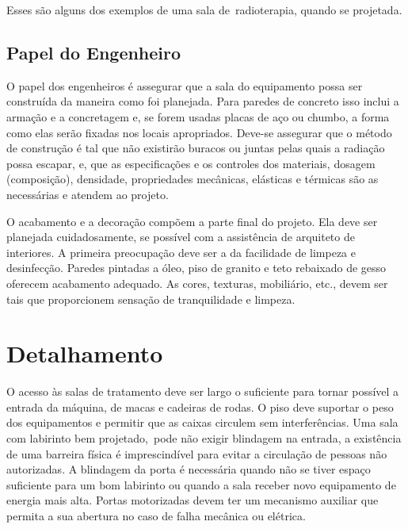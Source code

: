 \documentclass[
	12pt,				%
    oneside,			%
	a4paper,			%
	english,			%
	french,				%
	spanish,			%
	brazil,				%
	]{abntex2}
\begin{document}
Esses são alguns dos exemplos de uma sala de radioterapia, quando se projetada.

\section{Papel do Engenheiro}

O papel dos engenheiros é assegurar que a sala do equipamento possa ser construída da maneira como foi planejada. Para paredes de concreto isso inclui a armação e a concretagem e, se forem usadas placas de aço ou chumbo, a forma como elas serão fixadas nos locais apropriados. Deve-se assegurar que o método de construção é tal que não existirão buracos ou juntas pelas quais a radiação possa escapar, e, que as especificações e os controles dos materiais, dosagem (composição), densidade, propriedades mecânicas, elásticas e térmicas são as necessárias e atendem ao projeto.

O acabamento e a decoração compõem a parte final do projeto. Ela deve ser planejada cuidadosamente, se possível com a assistência de arquiteto de interiores. A primeira preocupação deve ser a da facilidade de limpeza e desinfecção. Paredes pintadas a óleo, piso de granito e teto rebaixado de gesso oferecem acabamento adequado. As cores, texturas, mobiliário, etc., devem ser tais que proporcionem sensação de tranquilidade e limpeza.

\chapter{Detalhamento}

O acesso às salas de tratamento deve ser largo o suficiente para tornar possível a entrada da máquina, de macas e cadeiras de rodas. O piso deve suportar o peso dos equipamentos e permitir que as caixas circulem sem interferências. Uma sala com labirinto bem projetado, pode não exigir blindagem na entrada, a existência de uma barreira física é imprescindível para evitar a circulação de pessoas não autorizadas. A blindagem da porta é necessária quando não se tiver espaço suficiente para um bom labirinto ou quando a sala receber novo equipamento de energia mais alta. Portas motorizadas devem ter um mecanismo auxiliar que permita a sua abertura no caso de falha mecânica ou elétrica. 
\end{document}
